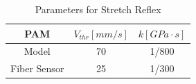 \begin{table}[h]
    \centering
    \caption{Parameters for Stretch Reflex} 
    \begin{tabular}{c|cc}
        \hline
        PAM &$V_{thr} [\si{mm/s}]$&$ k [\si{GPa\cdot s}]$\\
        \hline \hline
        Model & 70 & 1/800\\
        Fiber Sensor & 25 & 1/300\\
        \hline
    \end{tabular}
\label{tab:reflex_para}
\end{table}







